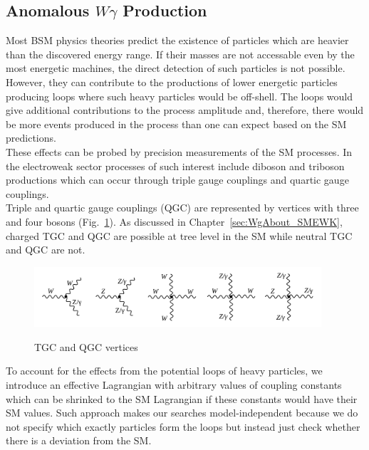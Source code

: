 \subsection{Anomalous $W\gamma$ Production}
\label{sec:WgAbout_ATGC}

Most BSM physics theories predict the existence of particles which are heavier than the discovered energy range. If their masses are not accessable even by the most energetic machines, the direct detection of such particles is not possible. However, they can contribute to the productions of lower energetic particles producing loops where such heavy particles would be off-shell. The loops would give additional contributions to the process amplitude and, therefore, there would be more events produced in the process than one can expect based on the SM predictions.\\

These effects can be probed by precision measurements of the SM processes. In the electroweak sector processes of such interest include diboson and triboson productions which can occur through triple gauge couplings and quartic gauge couplings.\\ 

Triple and quartic gauge couplings (QGC) are represented by vertices with three and four bosons (Fig.~\ref{fig:TGC_and_QGC_vertices}). As discussed in Chapter~\ref{sec:WgAbout_SMEWK}, charged TGC and QGC are possible at tree level in the SM while neutral TGC and QGC are not.\\ 


\begin{figure}[htb]
  \begin{center}
    {\includegraphics[width=0.95\textwidth]{../figs/WgAbout/TGC_and_QGC_vertices.png}}
    \caption{TGC and QGC vertices}
    \label{fig:TGC_and_QGC_vertices}
  \end{center}
\end{figure}

To account for the effects from the potential loops of heavy particles, we introduce an effective Lagrangian with arbitrary values of coupling constants which can be shrinked to the SM Lagrangian if these constants would have their SM values. Such approach makes our searches model-independent because we do not specify which exactly particles form the loops but instead just check whether there is a deviation from the SM. \\

